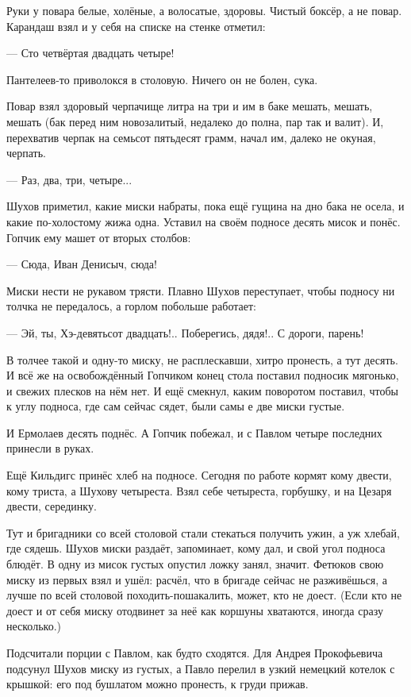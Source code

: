 Руки у повара белые, холёные, а волосатые, здоровы. Чистый боксёр, а не повар. Карандаш взял и
у себя на списке на стенке отметил:

--- Сто четвёртая \dash двадцать четыре!

Пантелеев-то приволокся в столовую. Ничего он не болен, сука.

Повар взял здоровый черпачище литра на три и им \dash в баке мешать, мешать, мешать (бак перед ним
новозалитый, недалеко до полна, пар так и валит). И, перехватив черпак на семьсот пятьдесят
грамм, начал им, далеко не окуная, черпать.

--- Раз, два, три, четыре...

Шухов приметил, какие миски набраты, пока ещё гущина на дно бака не осела, и какие
по-холостому \dash жижа одна. Уставил на своём подносе десять мисок и понёс. Гопчик ему машет от
вторых столбов:

--- Сюда, Иван Денисыч, сюда!

Миски нести \dash не рукавом трясти. Плавно Шухов переступает, чтобы подносу ни толчка не
передалось, а горлом побольше работает:

--- Эй, ты, Хэ-девятьсот двадцать!.. Поберегись, дядя!.. С дороги, парень!

В толчее такой и одну-то миску, не расплескавши, хитро пронесть, а тут \dash десять. И всё же на
освобождённый Гопчиком конец стола поставил подносик мягонько, и свежих плесков на нём нет.
И ещё смекнул, каким поворотом поставил, чтобы к углу подноса, где сам сейчас сядет, были самы
е две миски густые.

И Ермолаев десять поднёс. А Гопчик побежал, и с Павлом четыре последних принесли в руках.

Ещё Кильдигс принёс хлеб на подносе. Сегодня по работе кормят \dash кому двести, кому триста, а
Шухову \dash четыреста. Взял себе четыреста, горбушку, и на Цезаря двести, серединку.

Тут и бригадники со всей столовой стали стекаться \dash получить ужин, а уж хлебай, где сядешь.
Шухов миски раздаёт, запоминает, кому дал, и свой угол подноса блюдёт. В одну из мисок густых
опустил ложку \dash занял, значит. Фетюков свою миску из первых взял и ушёл: расчёл, что в бригаде
сейчас не разживёшься, а лучше по всей столовой походить-пошакалить, может, кто не доест.
(Если кто не доест и от себя миску отодвинет \dash за неё как коршуны хватаются, иногда сразу
несколько.)

Подсчитали порции с Павлом, как будто сходятся. Для Андрея Прокофьевича подсунул Шухов
миску из густых, а Павло перелил в узкий немецкий котелок с крышкой: его под бушлатом можно
пронесть, к груди прижав.

